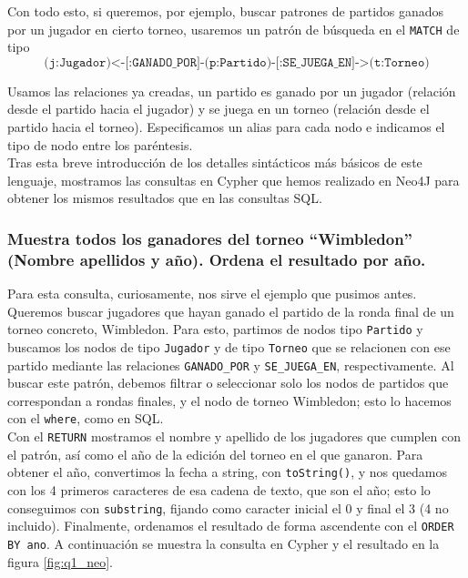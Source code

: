 Con todo esto, si queremos, por ejemplo, buscar patrones de partidos ganados por un jugador en cierto torneo, usaremos un patrón de búsqueda en el \texttt{MATCH} de tipo 
\begin{equation*}
    \texttt{(j:Jugador)<-[:GANADO\_POR]-(p:Partido)-[:SE\_JUEGA\_EN]->(t:Torneo)}
\end{equation*}

Usamos las relaciones ya creadas, un partido es ganado por un jugador (relación desde el partido hacia el jugador) y se juega en un torneo (relación desde el partido hacia el torneo). Especificamos un alias para cada nodo e indicamos el tipo de nodo entre los paréntesis. \\

Tras esta breve introducción de los detalles sintácticos más básicos de este lenguaje, mostramos las consultas en Cypher que hemos realizado en Neo4J para obtener los mismos resultados que en las consultas SQL. \\

\subsubsection{Muestra todos los ganadores del torneo ``Wimbledon'' (Nombre apellidos y año). Ordena el resultado por año.}

Para esta consulta, curiosamente, nos sirve el ejemplo que pusimos antes. Queremos buscar jugadores que hayan ganado el partido de la ronda final de un torneo concreto, Wimbledon. Para esto, partimos de nodos tipo \texttt{Partido} y buscamos los nodos de tipo \texttt{Jugador} y de tipo \texttt{Torneo} que se relacionen con ese partido mediante las relaciones \texttt{GANADO\_POR} y \texttt{SE\_JUEGA\_EN}, respectivamente. Al buscar este patrón, debemos filtrar o seleccionar solo los nodos de partidos que correspondan a rondas finales, y el nodo de torneo Wimbledon; esto lo hacemos con el \texttt{where}, como en SQL. \\

Con el \texttt{RETURN} mostramos el nombre y apellido de los jugadores que cumplen con el patrón, así como el año de la edición del torneo en el que ganaron. Para obtener el año, convertimos la fecha a string, con \texttt{toString()}, y nos quedamos con los 4 primeros caracteres de esa cadena de texto, que son el año; esto lo conseguimos con \texttt{substring}, fijando como caracter inicial el 0 y final el 3 (4 no incluido). Finalmente, ordenamos el resultado de forma ascendente con el \texttt{ORDER BY ano}. A continuación se muestra la consulta en Cypher y el resultado en la figura \ref{fig:q1_neo}.

